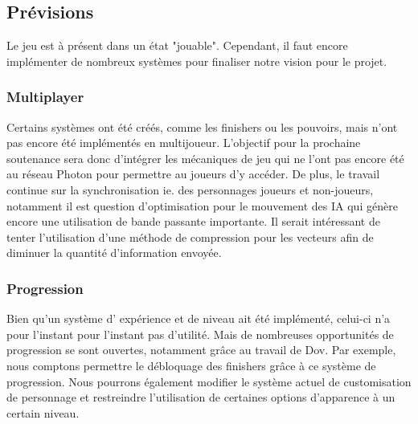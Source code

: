 \subsection{Prévisions}
Le jeu est à présent dans un état "jouable". Cependant, il faut encore implémenter de nombreux systèmes pour finaliser notre vision pour le projet.

	\subsubsection{Multiplayer}
	Certains systèmes ont été créés, comme les finishers ou les pouvoirs, mais n'ont pas encore été 
	implémentés en multijoueur. L'objectif pour la prochaine soutenance sera donc d'intégrer les mécaniques 
	de jeu qui ne l'ont pas encore été au réseau Photon pour permettre au joueurs d'y accéder. De plus, le 
	travail continue sur la synchronisation ie. des personnages joueurs et non-joueurs, notamment il est 
	question d'optimisation pour le mouvement des IA qui génère encore une utilisation de bande passante importante. 
	Il serait intéressant de tenter l'utilisation d'une méthode de compression pour les vecteurs afin de diminuer 
	la quantité d'information envoyée.

	\subsubsection{Progression}
		Bien qu'un système d' expérience et de niveau ait été implémenté, celui-ci n'a pour l'instant pour 
		l'instant pas d'utilité. Mais de nombreuses opportunités de progression se sont ouvertes, 
		notamment grâce au travail de Dov. Par exemple, nous comptons permettre le débloquage des 
		finishers grâce à ce système de progression. Nous pourrons également modifier le système actuel 
		de customisation de personnage et restreindre l'utilisation de certaines options d'apparence à un certain niveau.

